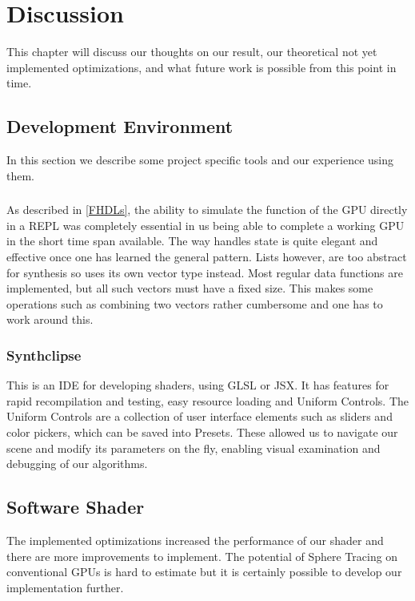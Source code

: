\chapter{Discussion} 

	This chapter will discuss our thoughts on our result, our theoretical not
	yet	implemented optimizations, and what future work is possible from this
	point in time.
	
	\section{Development Environment}
		
		In this section we describe some project specific tools and our experience using them.
		
		\subsection{\clash}
			As described in \ref{FHDLs}, the ability to simulate the function of
			the GPU directly in a REPL was completely essential in us being able
			to complete a working GPU in the short time span available. The way
			\clash{} handles state is quite elegant and effective once one has
			learned the general pattern. Lists however, are too abstract for
			synthesis so \clash{}  uses its own vector type instead. Most 
			regular
			data functions are implemented, but all such vectors must have a
			fixed size. This makes some operations such as combining two vectors
			rather cumbersome and one has to work around this.
	
		\subsection{Synthclipse}
			This is an IDE for developing shaders, using GLSL or JSX. It has
			features for rapid recompilation and testing, easy resource loading 
			and	Uniform Controls. The Uniform Controls are a collection of user
			interface elements such as sliders and color pickers, which can be
			saved into Presets. These allowed us to navigate our scene and 
			modify its parameters on the fly, enabling visual examination and 
			debugging of our algorithms.		
		
		\section{Software Shader}

			The implemented optimizations increased the performance of our 
			shader and there are more improvements to implement. The potential
			of Sphere Tracing on conventional GPUs is hard to estimate but 
			it is certainly possible to develop our implementation further.
			
